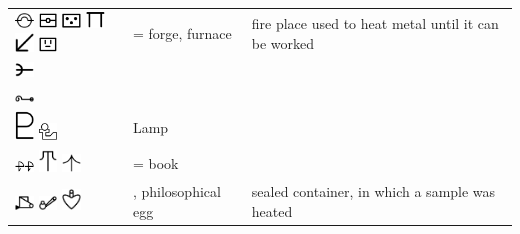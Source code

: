 \documentclass[british,final,landscape]{scrartcl}
\begin{document}
\begin{refsection}
\begin{supertabular}{p{0.3\textwidth}p{0.34\textwidth}p{0.34\textwidth}}
   \includegraphics[width=5mm]{Tools/Forge} \includegraphics[width=5mm]{Tools/Forge2} \includegraphics[width=5mm]{Tools/Forge3} \includegraphics[width=5mm]{Tools/Forge4} \includegraphics[width=5mm]{Tools/Forge5} \includegraphics[width=5mm]{Tools/Forge6} &  = forge, furnace & fire place used to heat metal until it can be worked\\
   \includegraphics[width=5mm]{Tools/FurnusCupellatori} &  & \\
   \includegraphics[width=5mm]{Tools/FurnusPubarion} &  & \\
   \includegraphics[width=5mm]{Tools/Lamp} \includegraphics[width=5mm]{Tools/Lamp2} & Lamp & \\
   \includegraphics[width=5mm]{Tools/Librum} \includegraphics[width=5mm]{Tools/Librum2} \includegraphics[width=5mm]{Tools/Librum3} &  = book & \\
   \includegraphics[width=5mm]{Tools/OvumPhilosophicum} \includegraphics[width=5mm]{Tools/OvumPhilosophicum2} \includegraphics[width=5mm]{Tools/OvumPhilosophicum3} & , philosophical egg & sealed container, in which a sample was heated \\

\end{supertabular}
\end{refsection}
\end{document}
